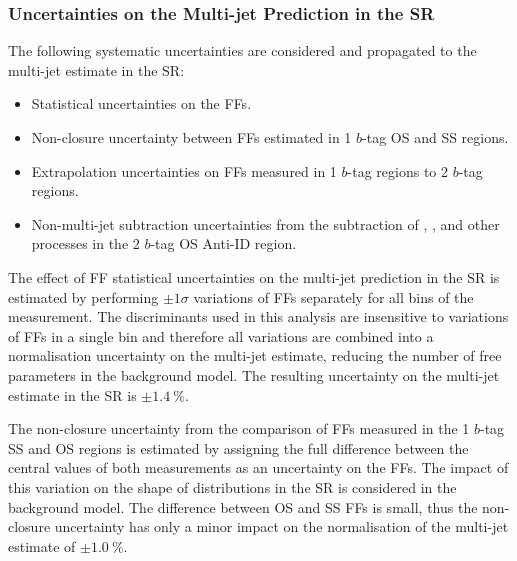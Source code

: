 \subsubsection{Uncertainties on the Multi-jet Prediction in the \hadhad SR}

%

The following systematic uncertainties are considered and propagated to the
multi-jet estimate in the \hadhad SR:
\begin{itemize}

\item Statistical uncertainties on the FFs.

\item Non-closure uncertainty between FFs estimated in 1 $b$-tag OS and SS
  regions.

\item Extrapolation uncertainties on FFs measured in 1 $b$-tag regions to 2
  $b$-tag regions.

\item Non-multi-jet subtraction uncertainties from the subtraction of \ttbar,
  \ttbarFakes, and other processes in the 2 $b$-tag OS Anti-ID region.

\end{itemize}

The effect of FF statistical uncertainties on the multi-jet prediction in the SR
is estimated by performing $\pm 1 \sigma$ variations of FFs separately for all
bins of the measurement. The discriminants used in this analysis are insensitive
to variations of FFs in a single bin and therefore all variations are combined
into a normalisation uncertainty on the multi-jet estimate, reducing the number
of free parameters in the background model. The resulting uncertainty on the
multi-jet estimate in the SR is $\pm \SI{1.4}{\percent}$.

The non-closure uncertainty from the comparison of FFs measured in the 1 $b$-tag
SS and OS regions is estimated by assigning the full difference between the
central values of both measurements as an uncertainty on the FFs. The impact of
this variation on the shape of distributions in the SR is considered in the
background model. The difference between OS and SS FFs is small, thus the
non-closure uncertainty has only a minor impact on the normalisation of the
multi-jet estimate of $\pm \SI{1.0}{\percent}$.

